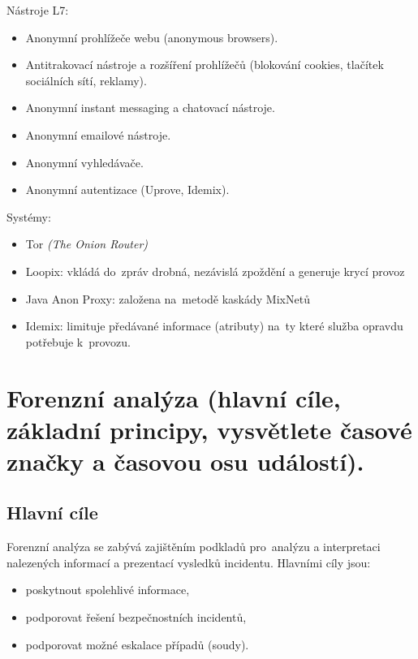 Nástroje L7:
\vspace*{-0.5em}\begin{itemize}
    \item Anonymní prohlížeče webu (anonymous browsers).
    \item Antitrakovací nástroje a rozšíření prohlížečů (blokování cookies, tlačítek sociálních sítí, reklamy).
    \item Anonymní instant messaging a chatovací nástroje.
    \item Anonymní emailové nástroje.
    \item Anonymní vyhledávače.
    \item Anonymní autentizace (Uprove, Idemix).
\end{itemize}

Systémy:
\vspace*{-0.5em}\begin{itemize}
    \item Tor \emph{(The Onion Router)}
    \item Loopix: vkládá do~zpráv drobná, nezávislá zpoždění a generuje krycí provoz
    \item Java Anon Proxy: založena na~metodě kaskády MixNetů
    \item Idemix: limituje předávané informace (atributy) na~ty které služba opravdu potřebuje k~provozu.
\end{itemize}

\clearpage
\section{Forenzní analýza (hlavní cíle, základní principy, vysvětlete časové značky a časovou osu událostí).}
\subsection{Hlavní cíle}

Forenzní analýza se zabývá zajištěním podkladů pro~analýzu a interpretaci nalezených informací a prezentací vysledků incidentu.
Hlavními cíly jsou:
\vspace*{-0.5em}\begin{itemize}
    \item poskytnout spolehlivé informace,
    \item podporovat řešení bezpečnostních incidentů,
    \item podporovat možné eskalace případů (soudy).
\end{itemize}

